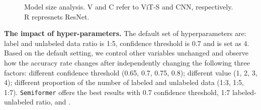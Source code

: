 \documentclass[runningheads]{llncs}
\makeatletter
\newcommand{\fakeparagraph}[1]{\textbf{#1}}
\newcommand*{\system}{\texttt{Semiformer}\@\xspace}
\newcommand\tabcaption{\def\@captype{table}\caption}
\makeatother
\begin{document}
\begin{figure}[t!]
\centering

\renewcommand\arraystretch{1.1}
\begin{minipage}[t]{.27\textwidth}
  \centering
    \setlength{\tabcolsep}{3pt}
    
    \renewcommand\arraystretch{1.0}
    \centering
\tabcaption{Results by different pseudo labels.}
    \label{table:pseudo-type}
    
    \setlength{\tabcolsep}{1.4pt}
\end{minipage}
\quad
\begin{minipage}[t]{.65\textwidth}
    \renewcommand\arraystretch{1.2}
    \centering
    \tabcaption{Model size analysis. V and C refer to ViT-S and CNN, respectively. R represnets ResNet.}
    \label{table:modelparam}
\end{minipage}

\end{figure}



\fakeparagraph{\bf The impact of hyper-parameters.}
The default  set of hyperparameters are: label and unlabeled data ratio is 1:5, confidence threshold is 0.7 and  is set as 4. Based on the default setting, we control other variables unchanged and observe how the accuracy rate changes after independently changing the following three factors: different confidence threshold (0.65, 0.7, 0.75, 0.8); different  value (1, 2, 3, 4); different proportion of the number of labeled and unlabeled data (1:3, 1:5, 1:7). \system offers the best results with 0.7 confidence threshold, 1:7 labeled-unlabeled ratio, and .
\end{document}
